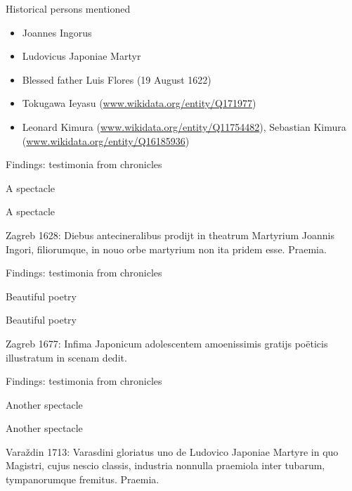 \documentclass[14pt]{beamer}
\begin{document}
\begin{frame}{Historical persons mentioned}

\begin{itemize}
\item Joannes Ingorus
\item Ludovicus Japoniae Martyr
\item Blessed father Luis Flores (19 August 1622)
\item Tokugawa Ieyasu (\href{http://www.wikidata.org/entity/Q171977}{www.wikidata.org/entity/Q171977})
\item Leonard Kimura (\href{http://www.wikidata.org/entity/Q11754482}{www.wikidata.org/entity/Q11754482}), Sebastian Kimura (\href{https://www.wikidata.org/entity/Q16185936}{www.wikidata.org/entity/Q16185936})
\end{itemize}

\end{frame}

\begin{frame}{Findings: testimonia from chronicles}

A spectacle


\end{frame}

\begin{frame}{A spectacle}

\alert{Zagreb 1628}: Diebus antecineralibus prodijt in theatrum Martyrium Joannis Ingori, filiorumque, in nouo orbe martyrium non ita pridem esse. Praemia.

\end{frame}

\begin{frame}{Findings: testimonia from chronicles}

Beautiful poetry


\end{frame}

\begin{frame}{Beautiful poetry}

\alert{Zagreb 1677}: Infima Japonicum adolescentem amoenissimis gratijs poëticis illustratum in scenam dedit.

\end{frame}

\begin{frame}{Findings: testimonia from chronicles}

Another spectacle


\end{frame}

\begin{frame}{Another spectacle}

\alert{Varaždin 1713}: Varasdini gloriatus uno de Ludovico Japoniae Martyre in quo Magistri, cujus nescio classis, industria nonnulla praemiola inter tubarum, tympanorumque fremitus. Praemia.

\end{frame}
\end{document}
